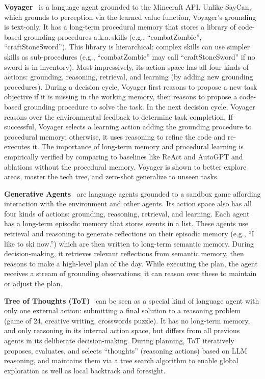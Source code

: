 \documentclass[10pt]{article} %
\begin{document}
\textbf{Voyager}~\citep{wang2023voyager} is a language agent grounded to the Minecraft API. Unlike SayCan, which grounds to perception via the learned value function, Voyager's grounding is text-only. It has a long-term procedural memory that stores a library of code-based grounding procedures a.k.a.\,skills (e.g., ``combatZombie'', ``craftStoneSword''). This library is hierarchical: complex skills can use simpler skills as sub-procedures (e.g., ``combatZombie'' may call ``craftStoneSword'' if no sword is in inventory). Most impressively, its action space has all four kinds of actions: grounding, reasoning, retrieval, and learning (by adding new grounding procedures). 
During a decision cycle, Voyager first reasons to propose a new task objective if it is missing in the working memory, then reasons to propose a code-based grounding procedure to solve the task. In the next decision cycle, Voyager reasons over the environmental feedback to determine task completion. If successful, Voyager selects a learning action adding the grounding procedure to procedural memory; otherwise, it uses reasoning to refine the code and re-executes it.
The importance of long-term memory and procedural learning is empirically verified by comparing to baselines like ReAct and AutoGPT and ablations without the procedural memory. Voyager is shown to better explore areas, master the tech tree, and zero-shot generalize to unseen tasks.

\textbf{Generative Agents}~\citep{park2023generative} are language agents grounded to a sandbox game affording interaction with the environment and other agents. Its action space also has all four kinds of actions: grounding, reasoning, retrieval, and learning. Each agent has a long-term episodic memory that stores events in a list. These agents use retrieval and reasoning to generate reflections on their episodic memory (e.g., ``I like to ski now.'') which are then written to long-term semantic memory. During decision-making, it retrieves relevant reflections from semantic memory, then reasons to make a high-level plan of the day. While executing the plan, the agent receives a stream of grounding observations; it can reason over these to maintain or adjust the plan. 

\textbf{Tree of Thoughts (ToT)}~\citep{yao2023tree} can be seen as a special kind of language agent with only one external action: submitting a final solution to a reasoning problem (game of 24, creative writing, crosswords puzzle). It has no long-term memory, and only reasoning in its internal action space, but differs from all previous agents in its deliberate decision-making. During planning, ToT iteratively proposes, evaluates, and selects ``thoughts'' (reasoning actions) based on LLM reasoning, and maintains them via a tree search algorithm to enable global exploration as well as local backtrack and foresight. 
\end{document}
